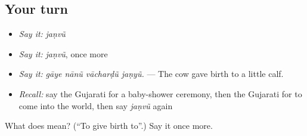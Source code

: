 \subsection*{Your turn}
\begin{itemize}
\raggedright
  \item \emph{Say it:} \emph{jaṇvũ}
  \item \emph{Say it:} \emph{jaṇvũ}, once more
  \item \emph{Say it:} \emph{gāye nānũ vācharḍũ jaṇyũ.} — The cow gave birth to a little calf.
  \item \emph{Recall:} say the Gujarati for a baby-shower ceremony, then the Gujarati for to come into the world, then say \emph{jaṇvũ} again
\end{itemize}

\begin{tcolorbox}[breakable,colback=teal!4,colframe=teal!35!black,title={Before you move on}]
What does  mean? (\textquotedblleft{}To give birth to\textquotedblright{}.) Say it once more.
\end{tcolorbox}
